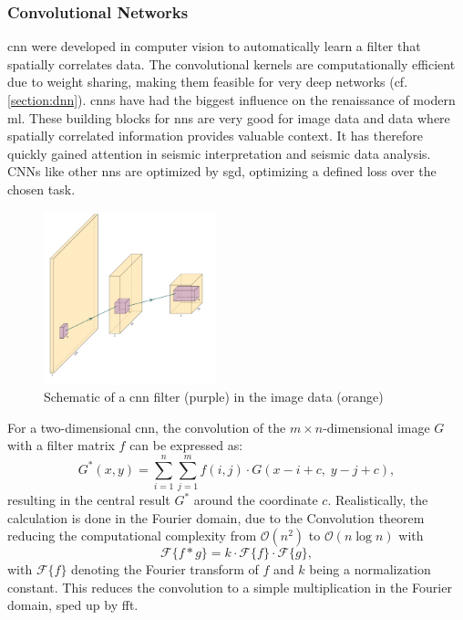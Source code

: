 \subsubsection{Convolutional Networks}
\label{section:cnn}
\acf{cnn} were developed in computer vision to automatically learn a filter that spatially correlates data. The convolutional kernels are computationally efficient due to weight sharing, making them feasible for very deep networks (cf. \cref{section:dnn}). \acp{cnn} have had the biggest influence on the renaissance of modern \ac{ml}. These building blocks for \acp{nn} are very good for image data and data where spatially correlated information provides valuable context. It has therefore quickly gained attention in seismic interpretation and seismic data analysis. CNNs like other \acp{nn} are optimized by \ac{sgd}, optimizing a defined loss over the chosen task.

\begin{figure}
    \centering
    \includegraphics[width=\textwidth,height=5cm,keepaspectratio]{figures/cnn_schema.pdf}
    \caption{Schematic of a \ac{cnn} filter (purple) in the image data (orange)}
    \label{fig:cnn}
\end{figure}

For a two-dimensional \ac{cnn}, the convolution of the $m\times n$-dimensional image $G$ with a filter matrix $f$ can be expressed as:
\begin{equation}
G^{*}(x,y) = \sum_{i=1}^{n} \sum_{j=1}^{m} f(i,j)\cdot G(x-i+c,\; y-j+c),
\end{equation}
resulting in the central result $G^{*}$ around the coordinate $c$. Realistically, the calculation is done in the Fourier domain, due to the Convolution theorem reducing the computational complexity from $\mathcal{O}(n^2)$ to $\mathcal{O}(n \log n)$ with
\begin{equation}
    \mathcal{F}\{f * g\} = k\cdot \mathcal{F}\{f\}\cdot \mathcal{F}\{g\},
\end{equation}
with $\mathcal{F} \{ f\}$ denoting the Fourier transform of $f$ and $k$ being a normalization constant. This reduces the convolution to a simple multiplication in the Fourier domain, sped up by \ac{fft}.

